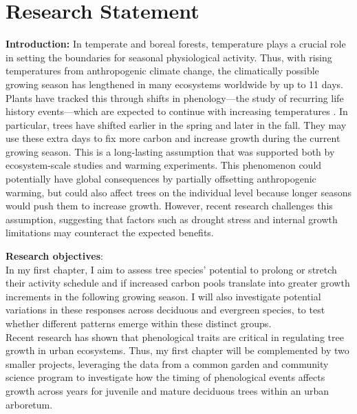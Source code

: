 \documentclass[11pt,letter]{article}
\begin{document}
\section* {Research Statement}
\textbf{Introduction:}
In temperate and boreal forests, temperature plays a crucial role in setting the boundaries for seasonal physiological activity. Thus, with rising temperatures from anthropogenic climate change, the climatically possible growing season has lengthened in many ecosystems worldwide by up to 11 days. \citep{korner_phenology_2010, menzel_growing_1999} Plants have tracked this through shifts in phenology—the study of recurring life history events—which are expected to continue with increasing temperatures \citep{wolkovich_warming_2012}. In particular, trees have shifted earlier in the spring and later in the fall. They may use these extra days to fix more carbon and increase growth during the current growing season. \citep{keenan_net_2014, wang_interactive_2020} This is a long-lasting assumption that was supported both by ecosystem-scale studies and warming experiments. This phenomenon could potentially have global consequences by partially offsetting anthropogenic warming, but could also affect trees on the individual level because longer seasons would push them to increase growth. \citep{grossiord_warming_2022} However, recent research challenges this assumption, suggesting that factors such as drought stress and internal growth limitations may counteract the expected benefits. \citep{dow_warm_2022, green_limits_2022}  %
\par
\textbf{Research objectives}: \\
In my first chapter, I aim to assess tree species’ potential to prolong or stretch their activity schedule and if increased carbon pools translate into greater growth increments in the following growing season. I will also investigate potential variations in these responses across deciduous and evergreen species, to test whether different patterns emerge within these distinct groups.\\
Recent research has shown that phenological traits are critical in regulating tree growth in urban ecosystems. \citep{simovic_functional_2024} Thus, my first chapter will be complemented by two smaller projects, leveraging the data from a common garden and community science program to investigate how the timing of phenological events affects growth across years for juvenile and mature deciduous trees within an urban arboretum. 
\par
\end{document}
